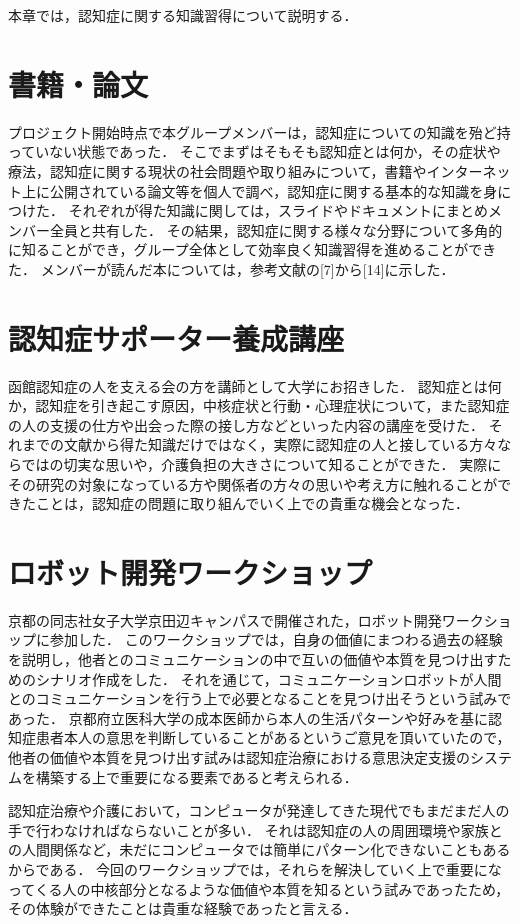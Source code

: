 \documentclass[../report]{subfiles}
\begin{document}
本章では，認知症に関する知識習得について説明する．

\section{書籍・論文}
プロジェクト開始時点で本グループメンバーは，認知症についての知識を殆ど持っていない状態であった．
そこでまずはそもそも認知症とは何か，その症状や療法，認知症に関する現状の社会問題や取り組みについて，書籍やインターネット上に公開されている論文等を個人で調べ，認知症に関する基本的な知識を身につけた．
それぞれが得た知識に関しては，スライドやドキュメントにまとめメンバー全員と共有した．
その結果，認知症に関する様々な分野について多角的に知ることができ，グループ全体として効率良く知識習得を進めることができた．
メンバーが読んだ本については，参考文献の[7]から[14]に示した．

\section{認知症サポーター養成講座}
函館認知症の人を支える会の方を講師として大学にお招きした．
認知症とは何か，認知症を引き起こす原因，中核症状と行動・心理症状について，また認知症の人の支援の仕方や出会った際の接し方などといった内容の講座を受けた．
それまでの文献から得た知識だけではなく，実際に認知症の人と接している方々ならではの切実な思いや，介護負担の大きさについて知ることができた．
実際にその研究の対象になっている方や関係者の方々の思いや考え方に触れることができたことは，認知症の問題に取り組んでいく上での貴重な機会となった．

\section{ロボット開発ワークショップ}
京都の同志社女子大学京田辺キャンパスで開催された，ロボット開発ワークショップに参加した．
このワークショップでは，自身の価値にまつわる過去の経験を説明し，他者とのコミュニケーションの中で互いの価値や本質を見つけ出すためのシナリオ作成をした．
それを通じて，コミュニケーションロボットが人間とのコミュニケーションを行う上で必要となることを見つけ出そうという試みであった．
京都府立医科大学の成本医師から本人の生活パターンや好みを基に認知症患者本人の意思を判断していることがあるというご意見を頂いていたので，他者の価値や本質を見つけ出す試みは認知症治療における意思決定支援のシステムを構築する上で重要になる要素であると考えられる．

認知症治療や介護において，コンピュータが発達してきた現代でもまだまだ人の手で行わなければならないことが多い．
それは認知症の人の周囲環境や家族との人間関係など，未だにコンピュータでは簡単にパターン化できないこともあるからである．
今回のワークショップでは，それらを解決していく上で重要になってくる人の中核部分となるような価値や本質を知るという試みであったため，その体験ができたことは貴重な経験であったと言える．
\end{document}
